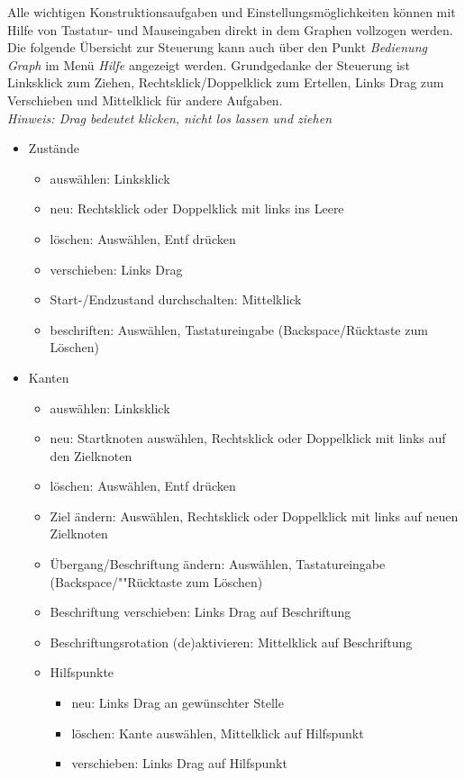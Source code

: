 Alle wichtigen Konstruktionsaufgaben und Einstellungsmöglichkeiten können mit Hilfe von Tastatur- und Mauseingaben direkt in dem Graphen vollzogen werden. Die folgende Übersicht zur Steuerung kann auch über den Punkt \textit{Bedienung Graph} im Menü \textit{Hilfe} angezeigt werden. Grundgedanke der Steuerung ist Linksklick zum Ziehen, Rechtsklick/Doppelklick zum Ertellen, Links Drag zum Verschieben und Mittelklick für andere Aufgaben.\\
\textit{Hinweis: Drag bedeutet klicken, nicht los lassen und ziehen}
\begin{itemize}                
\item Zustände
\begin{itemize}                
\item auswählen: Linksklick
\item neu: Rechtsklick oder Doppelklick mit links ins Leere
\item löschen: Auswählen, Entf drücken
\item verschieben: Links Drag
\item Start-/Endzustand durchschalten: Mittelklick
\item beschriften: Auswählen, Tastatureingabe (Backspace/Rücktaste zum Lö\-schen)
\end{itemize}
\item Kanten
\begin{itemize}                
\item auswählen: Linksklick
\item neu: Startknoten auswählen, Rechtsklick oder Doppelklick mit links auf den Zielknoten
\item löschen: Auswählen, Entf drücken
\item Ziel ändern: Auswählen, Rechtsklick oder Doppelklick mit links auf neuen Zielknoten
\item Übergang/Beschriftung ändern: Auswählen, Tastatureingabe (Back\-space/""Rück\-tas\-te zum Löschen)
\item Beschriftung verschieben: Links Drag auf Beschriftung
\item Beschriftungsrotation (de)aktivieren: Mittelklick auf Beschriftung
\item Hilfspunkte
\begin{itemize}                
\item neu: Links Drag an gewünschter Stelle
\item löschen: Kante auswählen, Mittelklick auf Hilfspunkt
\item verschieben: Links Drag auf Hilfspunkt

\end{itemize}
\end{itemize}
\end{itemize}
